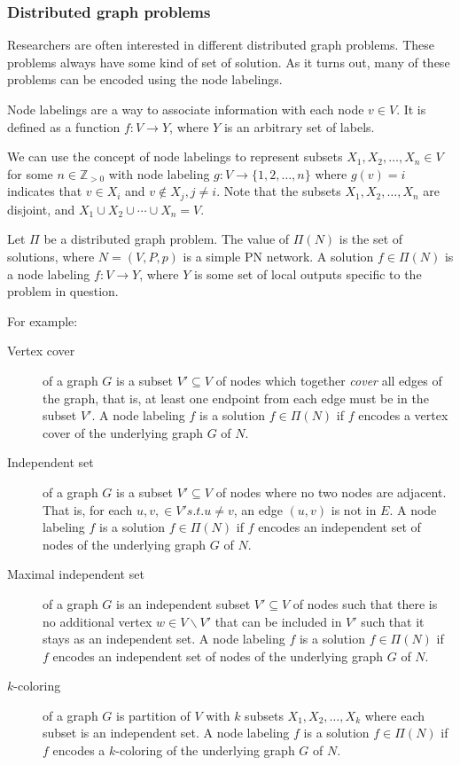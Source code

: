 \subsubsection{Distributed graph problems} \label{sec:dist_graph_probl}
Researchers are often interested in different distributed graph problems.
These problems always have some kind of set of solution.
As it turns out, many of these problems can be encoded using the node labelings.

Node labelings are a way to associate information with each node $v \in V$.
It is defined as a function $f\colon V \rightarrow Y$, where $Y$ is an arbitrary set of labels.

We can use the concept of node labelings to represent subsets $X_1, X_2, \dotsc, X_n \in V$ for some $n \in \mathbb{Z}_{>0}$ with node labeling $g\colon V \rightarrow \{1, 2, \dotsc, n\}$ where $g(v) = i$ indicates that $v \in X_i$ and $v \notin X_j, j \neq i$.
Note that the subsets $X_1, X_2, \dotsc, X_n$  are disjoint, and $X_1 \cup X_2 \cup \dotsb \cup X_n = V$.

Let $\Pi$ be a distributed graph problem.
The value of $\Pi(N)$ is the set of solutions, where $N=(V, P, p)$ is a simple PN network.
A solution $f \in \Pi(N)$ is a node labeling $f\colon V \rightarrow Y$, where $Y$ is some set of local outputs specific to the problem in question.

For example:
\begin{description}
  \item[Vertex cover] of a graph $G$ is a subset $V' \subseteq V$ of nodes which together \emph{cover} all edges of the graph, that is, at least one endpoint from each edge must be in the subset $V'$.
  A node labeling $f$ is a solution $f \in \Pi(N)$ if $f$ encodes a vertex cover of the underlying graph $G$ of $N$.
  \item[Independent set] of a graph $G$ is a subset $V' \subseteq V$ of nodes where no two nodes are adjacent. That is, for each $u, v, \in V' s.t. u \neq v$, an edge $(u, v)$ is not in $E$.
  A node labeling $f$ is a solution $f \in \Pi(N)$ if $f$ encodes an independent set of nodes of the underlying graph $G$ of $N$.
  \item[Maximal independent set] of a graph $G$ is an independent subset $V' \subseteq V$ of nodes such that there is no additional vertex $w \in V \backslash V'$ that can be included in $V'$ such that it stays as an independent set.
  A node labeling $f$ is a solution $f \in \Pi(N)$ if $f$ encodes an independent set of nodes of the underlying graph $G$ of $N$.
  \item[$k$-coloring] of a graph $G$ is partition of $V$ with $k$ subsets $X_1, X_2, \dotsc, X_k$ where each subset is an independent set.
  A node labeling $f$ is a solution $f \in \Pi(N)$ if $f$ encodes a $k$-coloring of the underlying graph $G$ of $N$.
\end{description}


